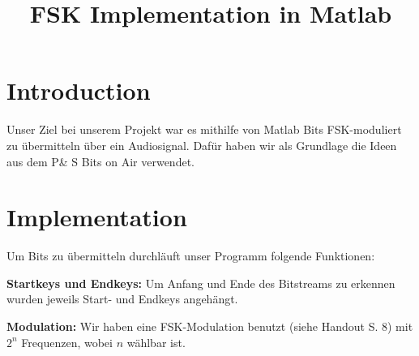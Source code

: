 \documentclass[11pt]{article}
\title{FSK Implementation in Matlab}
\begin{document}
\maketitle
\section*{Introduction}
Unser Ziel bei unserem Projekt war es mithilfe von Matlab Bits FSK-moduliert zu übermitteln über ein Audiosignal. Dafür haben wir als Grundlage die Ideen aus dem P\& S Bits on Air verwendet.
\section*{Implementation}
Um Bits zu übermitteln durchläuft unser Programm folgende Funktionen:

\textbf{Startkeys und Endkeys:} Um Anfang und Ende des Bitstreams zu erkennen wurden jeweils Start- und Endkeys angeh\"angt.

\textbf{Modulation:} Wir haben eine FSK-Modulation benutzt (siehe Handout S. 8) mit $2^n$ Frequenzen, wobei $n$ wählbar ist. 
\end{document}
